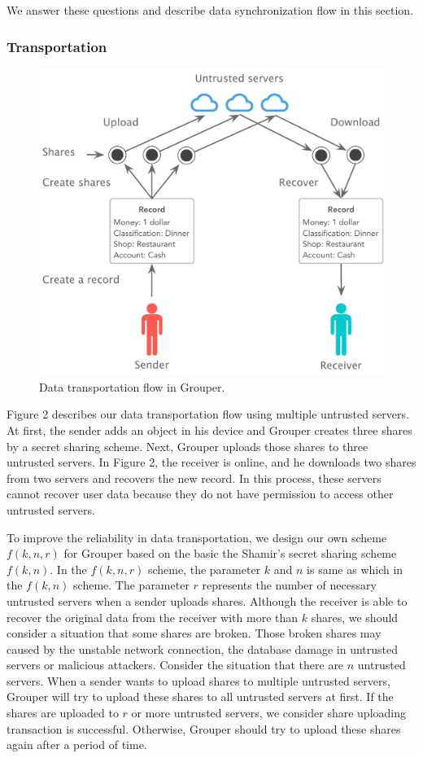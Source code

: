 \documentclass[twocolumn,10pt]{article}
\begin{document}
We answer these questions and describe data synchronization flow in this section.

\subsubsection{Transportation}

\begin{figure}[t]
	\centering
	\includegraphics[scale=0.36]{sync_flow}
	\caption{Data transportation flow in Grouper.}
\end{figure}

Figure 2 describes our data transportation flow using multiple untrusted servers. 
At first, the sender adds an object in his device and Grouper creates three shares by a secret sharing scheme. 
Next, Grouper uploads those shares to three untrusted servers. 
In Figure 2, the receiver is online, and he downloads two shares from two servers and recovers the new record. 
In this process, these servers cannot recover user data because they do not have permission to access other untrusted servers. 

To improve the reliability in data transportation, we design our own scheme $f(k, n, r)$ for Grouper based on the basic the Shamir's secret sharing scheme $f(k, n)$.
In the $f(k, n, r)$ scheme, the parameter $k$ and $n$ is same as which in the  $f(k, n)$ scheme. 
The parameter $r$ represents the number of necessary untrusted servers when a sender uploads shares.
Although the receiver is able to recover the original data from the receiver with more than $k$ shares, we should consider a situation that some shares are broken.
Those broken shares may caused by the unstable network connection, the database damage in untrusted servers or malicious attackers.
Consider the situation that there are $n$ untrusted servers. 
When a sender wants to upload shares to multiple untrusted servers, Grouper will try to upload these shares to all untrusted servers at first.
If the shares are uploaded to $r$ or more untrusted servers, we consider share uploading transaction is successful.
Otherwise, Grouper should try to upload these shares again after a period of time.
\end{document}
